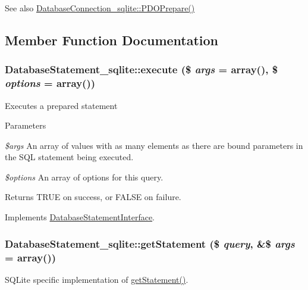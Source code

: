 \begin{DoxySeeAlso}{See also}
\hyperlink{classDatabaseConnection__sqlite_a8e377488ebb6c76e61590ca3f5d7245c}{DatabaseConnection\_\-sqlite::PDOPrepare()} 
\end{DoxySeeAlso}


\subsection{Member Function Documentation}
\hypertarget{classDatabaseStatement__sqlite_a2b23f3a9e83efae1690475b7c6cda0a8}{
\subsubsection[{execute}]{\setlength{\rightskip}{0pt plus 5cm}DatabaseStatement\_\-sqlite::execute (\$ {\em args} = {\ttfamily array()}, \/  \$ {\em options} = {\ttfamily array()})}}
\label{classDatabaseStatement__sqlite_a2b23f3a9e83efae1690475b7c6cda0a8}
Executes a prepared statement


\begin{DoxyParams}{Parameters}
\item[{\em \$args}]An array of values with as many elements as there are bound parameters in the SQL statement being executed. \item[{\em \$options}]An array of options for this query.\end{DoxyParams}
\begin{DoxyReturn}{Returns}
TRUE on success, or FALSE on failure. 
\end{DoxyReturn}


Implements \hyperlink{interfaceDatabaseStatementInterface_a716e454a44a7667f7a90b90c1a6fe3eb}{DatabaseStatementInterface}.\hypertarget{classDatabaseStatement__sqlite_a2d397baba57238e6797e59e9c36943b3}{
\subsubsection[{getStatement}]{\setlength{\rightskip}{0pt plus 5cm}DatabaseStatement\_\-sqlite::getStatement (\$ {\em query}, \/  \&\$ {\em args} = {\ttfamily array()})}}
\label{classDatabaseStatement__sqlite_a2d397baba57238e6797e59e9c36943b3}
SQLite specific implementation of \hyperlink{classDatabaseStatement__sqlite_a2d397baba57238e6797e59e9c36943b3}{getStatement()}.

